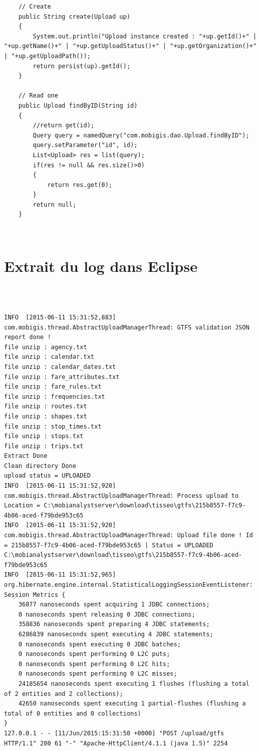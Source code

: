 \begin{lstlisting}
	// Create 
    public String create(Upload up)
    {
        System.out.println("Upload instance created : "+up.getId()+" | "+up.getName()+" | "+up.getUploadStatus()+" | "+up.getOrganization()+" | "+up.getUploadPath());
        return persist(up).getId();
    }

    // Read one
    public Upload findByID(String id)
    {
        //return get(id);
        Query query = namedQuery("com.mobigis.dao.Upload.findByID");
        query.setParameter("id", id);
        List<Upload> res = list(query);
        if(res != null && res.size()>0)
        {
            return res.get(0);
        }
        return null;
    }
\end{lstlisting} \\

\pagebreak

\section{Extrait du log dans Eclipse}\label{Annexe D}\\

\begin{lstlisting}

INFO  [2015-06-11 15:31:52,883] com.mobigis.thread.AbstractUploadManagerThread: GTFS validation JSON report done !
file unzip : agency.txt
file unzip : calendar.txt
file unzip : calendar_dates.txt
file unzip : fare_attributes.txt
file unzip : fare_rules.txt
file unzip : frequencies.txt
file unzip : routes.txt
file unzip : shapes.txt
file unzip : stop_times.txt
file unzip : stops.txt
file unzip : trips.txt
Extract Done
Clean directory Done
upload status = UPLOADED
INFO  [2015-06-11 15:31:52,920] com.mobigis.thread.AbstractUploadManagerThread: Process upload to Location = C:\mobianalystserver\download\tisseo\gtfs\215b8557-f7c9-4b06-aced-f79bde953c65
INFO  [2015-06-11 15:31:52,920] com.mobigis.thread.AbstractUploadManagerThread: Upload file done ! Id = 215b8557-f7c9-4b06-aced-f79bde953c65 | Status = UPLOADED
C:\mobianalystserver\download\tisseo\gtfs\215b8557-f7c9-4b06-aced-f79bde953c65
INFO  [2015-06-11 15:31:52,965] org.hibernate.engine.internal.StatisticalLoggingSessionEventListener: Session Metrics {
    36877 nanoseconds spent acquiring 1 JDBC connections;
    0 nanoseconds spent releasing 0 JDBC connections;
    358836 nanoseconds spent preparing 4 JDBC statements;
    6286839 nanoseconds spent executing 4 JDBC statements;
    0 nanoseconds spent executing 0 JDBC batches;
    0 nanoseconds spent performing 0 L2C puts;
    0 nanoseconds spent performing 0 L2C hits;
    0 nanoseconds spent performing 0 L2C misses;
    24185654 nanoseconds spent executing 1 flushes (flushing a total of 2 entities and 2 collections);
    42650 nanoseconds spent executing 1 partial-flushes (flushing a total of 0 entities and 0 collections)
}
127.0.0.1 - - [11/Jun/2015:15:31:50 +0000] "POST /upload/gtfs HTTP/1.1" 200 61 "-" "Apache-HttpClient/4.1.1 (java 1.5)" 2254
\end{lstlisting} 

